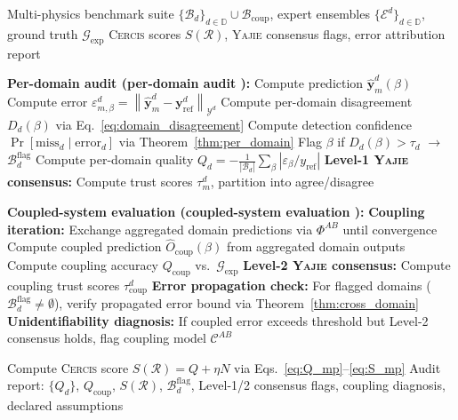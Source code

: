 \documentclass[11pt,a4paper]{article}
\theoremstyle{definition}
\newcommand{\Yajie}{\textsc{Yajie}}
\newcommand{\Cercis}{\textsc{Cercis}}
\newcommand{\norm}[1]{\left\lVert#1\right\rVert}
\newcommand{\domains}{\mathbb{D}}
\begin{document}
\begin{algorithm}[htbp]
\caption{SCX-Audited Multi-Physics Evaluation SCX}
\label{alg:evaluation}
\begin{algorithmic}[1]
\Require Multi-physics benchmark suite $\{\mathcal{B}_d\}_{d \in \domains} \cup \mathcal{B}_{\mathrm{coup}}$, expert ensembles $\{\mathcal{E}^d\}_{d \in \domains}$, ground truth $\mathcal{G}_{\mathrm{exp}}$
\Ensure \Cercis{} scores $S(\mathcal{R})$, \Yajie{} consensus flags, error attribution report

\For{each domain $d \in \domains$}
    \State \textbf{Per-domain audit (per-domain audit ):}
            \State Compute prediction $\hat{\mathbf{y}}_m^d(\beta)$
            \State Compute error $\varepsilon_{m,\beta}^d = \norm{\hat{\mathbf{y}}_m^d - \mathbf{y}_{\mathrm{ref}}^d}_{\mathcal{Y}^d}$
        \EndFor
        \State Compute per-domain disagreement $D_d(\beta)$ via Eq.~\eqref{eq:domain_disagreement}
        \State Compute detection confidence $\Pr[\text{miss}_d \mid \text{error}_d]$ via Theorem~\ref{thm:per_domain}
        \State Flag $\beta$ if $D_d(\beta) > \tau_d$ $\rightarrow$ $\mathcal{B}_d^{\mathrm{flag}}$
    \EndFor
    \State Compute per-domain quality $Q_d = -\frac{1}{|\mathcal{B}_d|}\sum_\beta |\varepsilon_{\beta} / y_{\mathrm{ref}}|$
    \State \textbf{Level-1 \Yajie{} consensus:} Compute trust scores $\tau_m^d$, partition into agree/disagree
\EndFor

\State \textbf{Coupled-system evaluation (coupled-system evaluation ):}
    \State \textbf{Coupling iteration:} Exchange aggregated domain predictions via $\Phi^{AB}$ until convergence
    \State Compute coupled prediction $\hat{O}_{\mathrm{coup}}(\beta)$ from aggregated domain outputs
    \State Compute coupling accuracy $Q_{\mathrm{coup}}$ vs.\ $\mathcal{G}_{\mathrm{exp}}$
    \State \textbf{Level-2 \Yajie{} consensus:} Compute coupling trust scores $\tau_{\mathrm{coup}}^d$
    \State \textbf{Error propagation check:} For flagged domains ($\mathcal{B}_d^{\mathrm{flag}} \neq \emptyset$), verify propagated error bound via Theorem~\ref{thm:cross_domain}
    \State \textbf{Unidentifiability diagnosis:} If coupled error exceeds threshold but Level-2 consensus holds, flag coupling model $\mathcal{C}^{AB}$
\EndFor

\State Compute \Cercis{} score $S(\mathcal{R}) = Q + \eta N$ via Eqs.~\eqref{eq:Q_mp}--\eqref{eq:S_mp}
\State \Return Audit report: $\{Q_d\}$, $Q_{\mathrm{coup}}$, $S(\mathcal{R})$, $\mathcal{B}_d^{\mathrm{flag}}$, Level-1/2 consensus flags, coupling diagnosis, declared assumptions
\end{algorithmic}
\end{algorithm}
\end{document}
